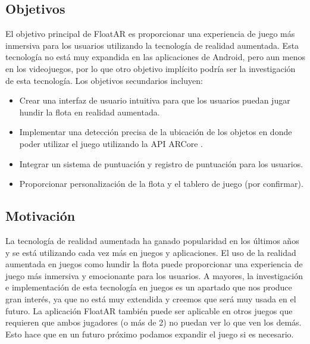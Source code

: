 \documentclass[a4paper, openright, 12pt]{article}
\begin{document}
\subsection{Objetivos}
El objetivo principal de FloatAR es proporcionar una experiencia de juego más inmersiva para los usuarios utilizando la tecnología de realidad aumentada. Esta tecnología no está muy expandida en las aplicaciones de Android, pero aun menos en los videojuegos, por lo que otro objetivo implícito podría ser la investigación de esta tecnología. Los objetivos secundarios incluyen:
\begin{itemize}
    \item Crear una interfaz de usuario intuitiva para que los usuarios puedan jugar hundir la flota en realidad aumentada.
    \item Implementar una detección precisa de la ubicación de los objetos en donde poder utilizar el juego utilizando la API ARCore \cite{ARCore}.
    \item Integrar un sistema de puntuación y registro de puntuación para los usuarios.
    \item Proporcionar personalización de la flota y el tablero de juego (por confirmar).
\end{itemize}
\subsection{Motivación}
La tecnología de realidad aumentada ha ganado popularidad en los últimos años y se está utilizando cada vez más en juegos y aplicaciones. El uso de la realidad aumentada en juegos como hundir la flota puede proporcionar una experiencia de juego más inmersiva y emocionante para los usuarios. A mayores, la investigación e implementación de esta tecnología en juegos es un apartado que nos produce gran interés, ya que no está muy extendida y creemos que será muy usada en el futuro. La aplicación FloatAR también puede ser aplicable en otros juegos que requieren que ambos jugadores (o más de 2) no puedan ver lo que ven los demás. Esto hace que en un futuro próximo podamos expandir el juego si es necesario.

\end{document}
